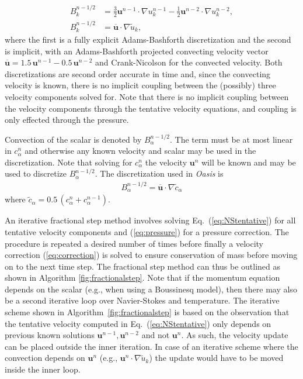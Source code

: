 \documentclass[final,3p,times,twocolumn]{elsarticle}
\newcounter{bla}
\begin{document}
\begin{align}
  B_{k}^{n-1/2} &= \frac{3}{2} \bm{u}^{n-1} \cdot \nabla u_k^{n-1} - \frac{1}{2} \bm{u}^{n-2} \cdot \nabla u_k^{n-2}, \label{eq:convection_ABE}\\
  B_{k}^{n-1/2} &= \overline{\bm{u}} \cdot \nabla \tilde{u}_k, \label{eq:convection_ABCN}
\end{align}
where the first is a fully explicit Adams-Bashforth discretization and the second is implicit, with an Adams-Bashforth projected convecting velocity vector $\overline{\bm{u}} = 1.5\, \bm{u}^{n-1} - 0.5\, \bm{u}^{n-2}$ and Crank-Nicolson for the convected velocity. Both discretizations are second order accurate in time and, since the convecting velocity is known,  there is no implicit coupling between the (possibly) three velocity components solved for. Note that there is no implicit coupling between the velocity components through the tentative velocity equations, and coupling is only effected through the pressure.

Convection of the scalar is denoted by $B_{\alpha}^{n-1/2}$. The term must be at most linear in $c_{\alpha}^n$ and otherwise any known velocity and scalar may be used in the discretization. Note that solving for $c_{\alpha}^n$ the velocity $\bm{u}^n$ will be known and may be used to discretize $B_{\alpha}^{n-1/2}$. The discretization used in \emph{Oasis} is
\begin{align*}
  B_{\alpha}^{n-1/2} = \overline{\bm{u}} \cdot \nabla \tilde{c}_{\alpha}
\end{align*}
where $\tilde{c}_{\alpha} = 0.5\,(c_{\alpha}^n+c_{\alpha}^{n-1})$.

An iterative fractional step method involves solving Eq.~(\ref{eq:NStentative}) for all tentative velocity components and (\ref{eq:pressure}) for a pressure correction. The procedure is repeated a desired number of times before finally a velocity correction (\ref{eq:correction}) is solved to ensure conservation of mass before moving on to the next time step. The fractional step method can thus be outlined as shown in Algorithm \ref{fig:fractionalstep}. Note that if the momentum equation depends on the scalar (e.g., when using a Boussinesq model), then there may also be a second iterative loop over Navier-Stokes and temperature. The iterative scheme shown in Algorithm~\ref{fig:fractionalstep} is based on the observation that the tentative velocity computed in Eq.~(\ref{eq:NStentative}) only depends on previous known solutions $\bm{u}^{n-1}, \bm{u}^{n-2} $ and not $\bm{u}^n$. As such, the velocity update can be placed outside the inner iteration. In case of an iterative scheme where the convection depends on $\bm{u}^n$ (e.g., $\bm{u}^n\cdot \nabla \tilde{u}_k$) the update would have to be moved inside the inner loop.
\end{document}
